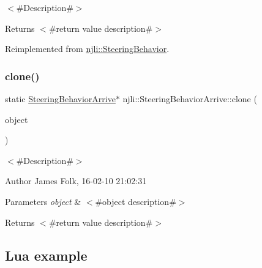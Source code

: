 $<$\#\+Description\#$>$

\begin{DoxyReturn}{Returns}
$<$\#return value description\#$>$ 
\end{DoxyReturn}


Reimplemented from \mbox{\hyperlink{classnjli_1_1_steering_behavior_abbc461d853c1b225cfde5b79d96d11bd}{njli\+::\+Steering\+Behavior}}.

\mbox{\label{classnjli_1_1_steering_behavior_arrive_aa53741674c97533bb49a16089cd824c9}} 
\subsubsection{\texorpdfstring{clone()}{clone()}}
{\footnotesize\ttfamily static \mbox{\hyperlink{classnjli_1_1_steering_behavior_arrive}{Steering\+Behavior\+Arrive}}$\ast$ njli\+::\+Steering\+Behavior\+Arrive\+::clone (\begin{DoxyParamCaption}\item[{const \mbox{\hyperlink{classnjli_1_1_steering_behavior_arrive}{Steering\+Behavior\+Arrive}} \&}]{object }\end{DoxyParamCaption})\hspace{0.3cm}{\ttfamily [static]}}



$<$\#\+Description\#$>$ 

\begin{DoxyAuthor}{Author}
James Folk, 16-\/02-\/10 21\+:02\+:31
\end{DoxyAuthor}

\begin{DoxyParams}{Parameters}
{\em object} & $<$\#object description\#$>$\\
\hline
\end{DoxyParams}
\begin{DoxyReturn}{Returns}
$<$\#return value description\#$>$
\end{DoxyReturn}
\hypertarget{classnjli_1_1_steering_behavior_wander_ex1}{}\subsection{Lua example}\label{classnjli_1_1_steering_behavior_wander_ex1}

